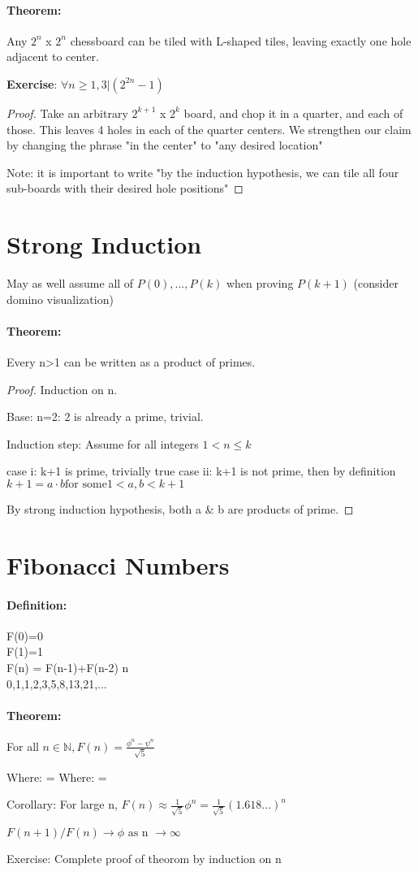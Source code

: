 \documentclass[11pt, notitlepage]{report}
\newcommand{\N}{\mathbb{N}}
\newenvironment{theorem}{\paragraph{Theorem:}}{\hfill}
\newenvironment{definition}{\paragraph{Definition:}}{\hfill}
\begin{document}
\begin{theorem}
	Any $2^n$ x $2^n$ chessboard can be tiled with L-shaped tiles, leaving exactly one hole adjacent to center.
	
	\textbf{Exercise}: $\forall n\geq 1, 3 | (2^{2n} - 1)$ 
	
	\begin{proof}
		Take an arbitrary $2^{k+1} $  x $ 2^{k}$ board, and chop it in a quarter, and each of those. This leaves 4 holes in each of the quarter centers. We strengthen our claim by changing the phrase "in the center" to "any desired location"
		
		Note: it is important to write "by the induction hypothesis, we can tile all four sub-boards with their desired hole positions"
	\end{proof}
\end{theorem}

\section{Strong Induction}

May as well assume all of $P(0),...,P(k)$ when proving $P(k+1)$ (consider domino visualization)

\begin{theorem}
	Every n>1 can be written as a product of primes.
	
	\begin{proof}
		Induction on n.
		
		Base: n=2: 2 is already a prime, trivial.
		
		Induction step: Assume for all integers $1<n\leq k$
		
		case i: k+1 is prime, trivially true
		case ii: k+1 is not prime, then by definition $k+1 = a\cdot b \text{for some} 1< a,b < k+1$
		
		By strong induction hypothesis, both a \& b are products of prime. 
	\end{proof}
\end{theorem}

\section{Fibonacci Numbers}

\begin{definition}
	F(0)=0 \\
	F(1)=1 \\
	F(n) = F(n-1)+F(n-2) \forall n  \\
	0,1,1,2,3,5,8,13,21,...
\end{definition}

\begin{theorem}
	For all $n\in\N, F(n) = \frac{\phi^n-\psi^n}{\sqrt{5}}$
	
	Where: \phi = 
	Where: \psi = 
	
	Corollary: For large n, $F(n) \approx \frac{1}{\sqrt{5}}\phi^n=\frac{1}{\sqrt{5}}(1.618...)^n$
	
	$F(n+1)/F(n) \rightarrow \phi \text{ as n } \rightarrow \infty$
	
	Exercise: Complete proof of theorom by induction on n
	
\end{theorem}
\end{document}
